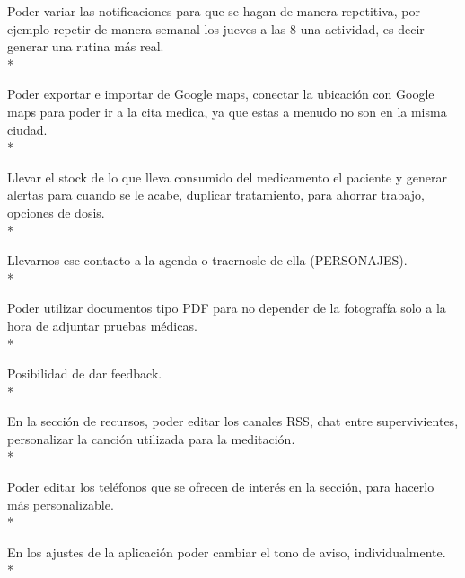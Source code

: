 \documentclass[../pfc.tex]{subfiles}
\begin{document}
	Poder variar las notificaciones para que se hagan de manera repetitiva, por ejemplo repetir de manera semanal los jueves a las 8 una actividad, es decir generar una rutina más real. \\*
	
	Poder exportar e importar de Google maps, conectar la ubicación con Google maps para poder ir a la cita medica, ya que estas a menudo no son en la misma ciudad.\\*
	
	Llevar el stock de lo que lleva consumido del medicamento el paciente y generar alertas para cuando se le acabe, duplicar tratamiento, para ahorrar trabajo, opciones de dosis.\\*
	
	Llevarnos ese contacto a la agenda o traernosle de ella (PERSONAJES).\\*
	
	Poder utilizar documentos tipo PDF para no depender de la fotografía solo a la hora de adjuntar pruebas médicas.\\*
	
	Posibilidad de dar feedback.\\*
	
	En la sección de recursos, poder editar los canales RSS, chat entre supervivientes, personalizar la canción utilizada para la meditación.\\*
	
	Poder editar los teléfonos que se ofrecen de interés en la sección, para hacerlo más personalizable.\\*
	
	En los ajustes de la aplicación poder cambiar el tono de aviso, individualmente.\\* 
	
	
		
	
	


	

	
\end{document}

